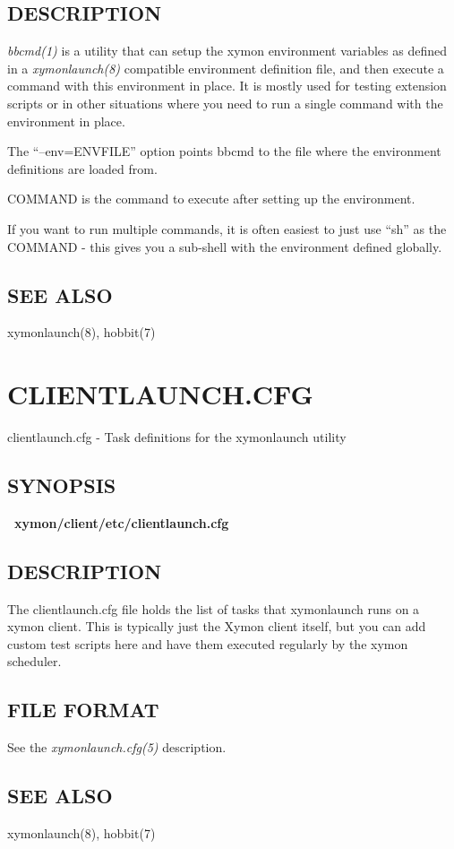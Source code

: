  
\subsection{DESCRIPTION}
\emph{bbcmd(1)} is a utility that can setup the xymon environment
variables as defined in a \emph{xymonlaunch(8)} compatible
environment definition file, and then execute a command with this
environment in place. It is mostly used for testing extension scripts
or in other situations where you need to run a single command with the
environment in place. 


The ``--env=ENVFILE'' option points bbcmd to the file where the
environment definitions are loaded from. 



COMMAND is the command to execute after setting up the environment. 

If you want to run multiple commands, it is often easiest to just use
``sh'' as the COMMAND - this gives you a sub-shell with the
environment defined globally. 

\subsection{SEE ALSO} xymonlaunch(8), hobbit(7) 



%
\newpage
\section{CLIENTLAUNCH.CFG}
 clientlaunch.cfg - Task definitions for the xymonlaunch utility 

 
\subsection{SYNOPSIS}
\textbf{~xymon/client/etc/clientlaunch.cfg}


 
\subsection{DESCRIPTION}
 The clientlaunch.cfg file holds the list of tasks that xymonlaunch
 runs on a xymon client. This is typically just the Xymon client
 itself, but you can add custom test scripts here and have them
 executed regularly by the xymon scheduler. 


 
\subsection{FILE FORMAT}
 See the \emph{xymonlaunch.cfg(5)}
 description. 

 
\subsection{SEE ALSO}
xymonlaunch(8), hobbit(7) 

